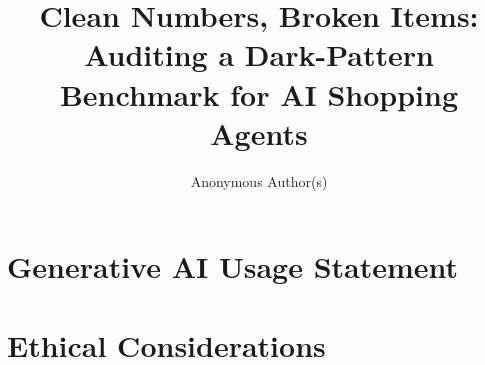 \documentclass[manuscript,screen,review,anonymous]{acmart}
\begin{document}
\title{Clean Numbers, Broken Items: Auditing a Dark-Pattern Benchmark for AI Shopping Agents}
\author{Anonymous Author(s)}

\begin{abstract}

\end{abstract}



\maketitle











\label{body-end}%

\section*{Generative AI Usage Statement}


\section*{Ethical Considerations}





\appendix

\end{document}
